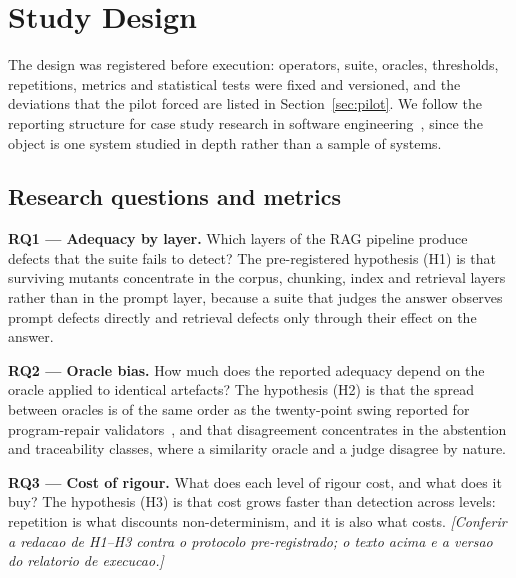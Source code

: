 \documentclass[a4paper,fleqn]{cas-dc}
\newcommand{\nota}[1]{{\color{blue}\itshape [#1]}}
\begin{document}
\section{Study Design}
\label{sec:design}

The design was registered before execution: operators, suite, oracles,
thresholds, repetitions, metrics and statistical tests were fixed and
versioned, and the deviations that the pilot forced are listed in
Section~\ref{sec:pilot}. We follow the reporting structure for case study
research in software engineering~\cite{runeson2009guidelines}, since the
object is one system studied in depth rather than a sample of systems.

\subsection{Research questions and metrics}
\label{sec:rqs}

\textbf{RQ1 --- Adequacy by layer.} Which layers of the RAG pipeline produce
defects that the suite fails to detect? The pre-registered hypothesis
(H1) is that surviving mutants concentrate in the corpus, chunking, index and
retrieval layers rather than in the prompt layer, because a suite that judges
the answer observes prompt defects directly and retrieval defects only through
their effect on the answer.

\textbf{RQ2 --- Oracle bias.} How much does the reported adequacy depend on the
oracle applied to identical artefacts? The hypothesis (H2) is that the spread
between oracles is of the same order as the twenty-point swing reported for
program-repair validators~\cite{bonfim2026evaluator}, and that disagreement
concentrates in the abstention and traceability classes, where a similarity
oracle and a judge disagree by nature.

\textbf{RQ3 --- Cost of rigour.} What does each level of rigour cost, and what
does it buy? The hypothesis (H3) is that cost grows faster than detection
across levels: repetition is what discounts non-determinism, and it is also
what costs.
\nota{Conferir a redacao de H1--H3 contra o protocolo pre-registrado; o
texto acima e a versao do relatorio de execucao.}
\end{document}
